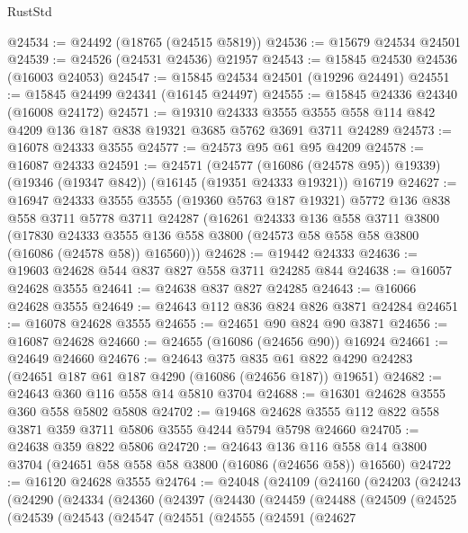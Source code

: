 \begin{lexlean}{RustStd}
\begin{coremodule}
@24534 := @24492 (@18765 (@24515 @5819))
@24536 := @15679 @24534 @24501
@24539 := @24526 (@24531 @24536) @21957
@24543 := @15845 @24530 @24536 (@16003 @24053)
@24547 := @15845 @24534 @24501 (@19296 @24491)
@24551 := @15845 @24499 @24341 (@16145 @24497)
@24555 := @15845 @24336 @24340 (@16008 @24172)
@24571 := @19310
    @24333
    @3555
    @3555
    @558
    @114
    @842
    @4209
    @136
    @187
    @838
    @19321
    @3685
    @5762
    @3691
    @3711
    @24289
@24573 := @16078 @24333 @3555
@24577 := @24573 @95 @61 @95 @4209
@24578 := @16087 @24333
@24591 := @24571
    (@24577 (@16086 (@24578 @95)) @19339)
    (@19346 (@19347 @842))
    (@16145 (@19351 @24333 @19321))
    @16719
@24627 := @16947
    @24333
    @3555
    @3555
    (@19360 @5763 @187 @19321)
    @5772
    @136
    @838
    @558
    @3711
    @5778
    @3711
    @24287
    (@16261
      @24333
      @136
      @558
      @3711
      @3800
      (@17830
        @24333
        @3555
        @136
        @558
        @3800
        (@24573 @58 @558 @58 @3800 (@16086 (@24578 @58)) @16560)))
@24628 := @19442 @24333
@24636 := @19603 @24628 @544 @837 @827 @558 @3711 @24285 @844
@24638 := @16057 @24628 @3555
@24641 := @24638 @837 @827 @24285
@24643 := @16066 @24628 @3555
@24649 := @24643 @112 @836 @824 @826 @3871 @24284
@24651 := @16078 @24628 @3555
@24655 := @24651 @90 @824 @90 @3871
@24656 := @16087 @24628
@24660 := @24655 (@16086 (@24656 @90)) @16924
@24661 := @24649 @24660
@24676 := @24643
    @375
    @835
    @61
    @822
    @4290
    @24283
    (@24651 @187 @61 @187 @4290 (@16086 (@24656 @187)) @19651)
@24682 := @24643 @360 @116 @558 @14 @5810 @3704
@24688 := @16301 @24628 @3555 @360 @558 @5802 @5808
@24702 := @19468 @24628 @3555 @112 @822 @558 @3871 @359 @3711 @5806 @3555 @4244 @5794 @5798 @24660
@24705 := @24638 @359 @822 @5806
@24720 := @24643
    @136
    @116
    @558
    @14
    @3800
    @3704
    (@24651 @58 @558 @58 @3800 (@16086 (@24656 @58)) @16560)
@24722 := @16120 @24628 @3555
@24764 := @24048
    (@24109
      (@24160
        (@24203
          (@24243
            (@24290
              (@24334
                (@24360
                  (@24397
                    (@24430
                      (@24459
                        (@24488
                          (@24509
                            (@24525
                              (@24539
                                (@24543
                                  (@24547
                                    (@24551
                                      (@24555
                                        (@24591
                                          (@24627

\end{coremodule}
\end{lexlean}
